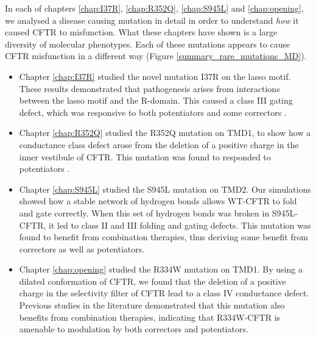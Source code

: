 In each of chapters \ref{chap:I37R}, \ref{chap:R352Q}, \ref{chap:S945L} and \ref{chap:opening}, we analysed a disease causing mutation in detail in order to understand \textit{how} it caused CFTR to misfunction. What these chapters have shown is a large diversity of molecular phenotypes. Each of these mutations appears to cause CFTR misfunction in a different way (Figure \ref{summary_rare_mutations_MD}). 


\begin{itemize}
	\item Chapter \ref{chap:I37R} studied the novel mutation I37R on the lasso motif. These results demonstrated that pathogenesis arises from interactions between the lasso motif and the R-domain. This caused a class III gating defect, which was responsive to both potentiators and some correctors \cite{wong2022}. 
	\item Chapter \ref{chap:R352Q} studied the R352Q mutation on TMD1, to show how a conductance class defect arose from the deletion of a positive charge in the inner vestibule of CFTR. This mutation was found to responded to potentiators \cite{wong2022a}.
\item Chapter \ref{chap:S945L} studied the S945L mutation on TMD2. Our simulations showed how a stable network of hydrogen bonds allows WT-CFTR to fold and gate correctly. When this set of hydrogen bonds was broken in S945L-CFTR, it led to class II and III folding and gating defects. This mutation was found to benefit from combination therapies, thus deriving some benefit from correctors as well as potentiators.  
\item Chapter \ref{chap:opening} studied the R334W mutation on TMD1. By using a dilated conformation of CFTR, we found that the deletion of a positive charge in the selectivity filter of CFTR lead to a class IV conductance defect. Previous studies in the literature demonstrated that this mutation also benefits from combination therapies, indicating that R334W-CFTR is amenable to modulation by both correctors and potentiators. 
\end{itemize}

